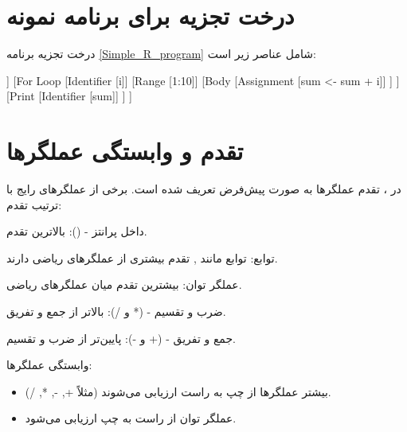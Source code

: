 \documentclass[11pt, a4paper, oneside]{book}
\newcounter{itemadded}
\let\LaTeXStandardEnumerateBegin\enumerate
\let\LaTeXStandardEnumerateEnd\endenumerate
\renewenvironment{enumerate}{%
	\LaTeXStandardEnumerateBegin%
	\setcounter{itemadded}{0}
}{%
	\LaTeXStandardEnumerateEnd%
}%
\begin{document}
				
			\section{درخت تجزیه برای برنامه نمونه}
				درخت تجزیه برنامه \ref{Simple_R_program} شامل عناصر زیر است:
				
				\begin{latin}
					\begin{forest}
						[
							Program
								[Assignment [sum <- 0]]
								[For Loop
									[Identifier [i]]
									[Range [1:10]]
									[Body
										[Assignment [sum <- sum + i]]
									]
								]
								[Print
									[Identifier [sum]]
								]
						]
					\end{forest}
				\end{latin}


		\section{تقدم و وابستگی عملگرها}
			
			در ، تقدم عملگرها به صورت پیش‌فرض تعریف شده است. برخی از عملگرهای رایج با ترتیب تقدم:
			
			\begin{enumerate}
				
				\item {\large داخل پرانتز - ()}:
				{\normalsize بالاترین تقدم.}
				
				\item {\large توابع}:
				{\normalsize توابع مانند ,  تقدم بیشتری از عملگرهای ریاضی دارند.}
				
				\item {\large عملگر توان}:
				{\normalsize بیشترین تقدم میان عملگرهای ریاضی.}
				
				\item {\large ضرب و تقسیم - (* و /)}:
				{\normalsize بالاتر از جمع و تفریق.}
				
				\item {\large جمع و تفریق - (+ و -)}:
				{\normalsize پایین‌تر از ضرب و تقسیم.}
				
			\end{enumerate}
			
			{\Large وابستگی عملگرها:}
			
			\begin{itemize}
				
				\item بیشتر عملگرها از چپ به راست ارزیابی می‌شوند (مثلاً +, -, *, /).
				
				\item عملگر توان از راست به چپ ارزیابی می‌شود.
				
			\end{itemize}
			
\end{document}
